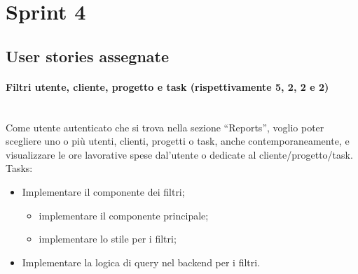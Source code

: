 
\section{Sprint 4}
\label{sec:sprint4}

\subsection{User stories assegnate}
\paragraph{Filtri utente, cliente, progetto e task (rispettivamente 5, 2, 2 e 2)}\mbox{} \\[\baselineskip]
\noindent Come utente autenticato che si trova nella sezione “Reports”, voglio poter scegliere uno o più utenti, clienti, progetti o task, anche contemporaneamente, e visualizzare le ore lavorative spese dal'utente o dedicate al cliente/progetto/task.\\

\noindent Tasks:

\begin{itemize}
  \item Implementare il componente dei filtri;
  \begin{itemize}
    \item implementare il componente principale;
    \item implementare lo stile per i filtri;
  \end{itemize}
  \item Implementare la logica di query nel backend per i filtri.
\end{itemize}

